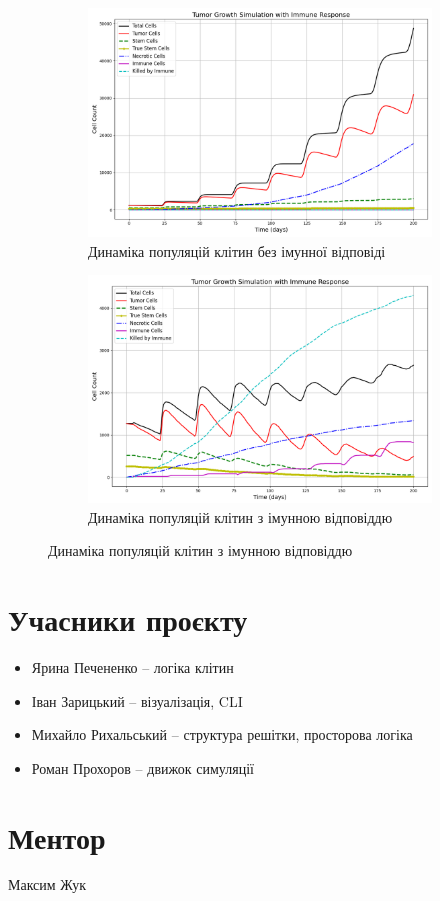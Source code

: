 \documentclass{article}
\begin{document}
\begin{figure}[H]
    \centering
    \begin{subfigure}[t]{0.75\linewidth}
        \centering
        \includegraphics[width=\linewidth]{tumor_simulation_stats/tumor_stats.png}
        \caption{Динаміка популяцій клітин без імунної відповіді}
        \label{fig:tumor-stats-no-immune}
    \end{subfigure}
    
    \begin{subfigure}[t]{0.75\linewidth}
        \centering
        \includegraphics[width=\linewidth]{tumor_immune_simulation_stats/tumor_immune_stats.png}
        \caption{Динаміка популяцій клітин з імунною відповіддю}
        \label{fig:tumor-stats-immune}
    \end{subfigure}
    \label{fig:stats-comparison}
\end{figure}

\section{Учасники проєкту}
\begin{itemize}
    \item Ярина Печененко – логіка клітин
    \item Іван Зарицький – візуалізація, CLI
    \item Михайло Рихальський – структура решітки, просторова логіка
    \item Роман Прохоров – движок симуляції
\end{itemize}

\section{Ментор}
Максим Жук
\end{document}
